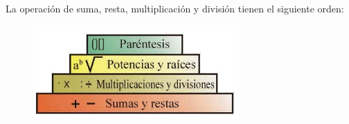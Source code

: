 \begin{tcolorbox}[
        colback=colorrds!5!white,
        colframe=colorrds!35!white,
        coltitle=black,
        fonttitle=\bfseries,
        center title,
        title=Jerarquía de operaciones]
    La operación de suma, resta, multiplicación y división tienen el siguiente orden:
    \begin{figure}[H]
        \centering
        \includegraphics[width=0.7\textwidth]{../images/jerarquia.jpg}
    \end{figure}
\end{tcolorbox}



